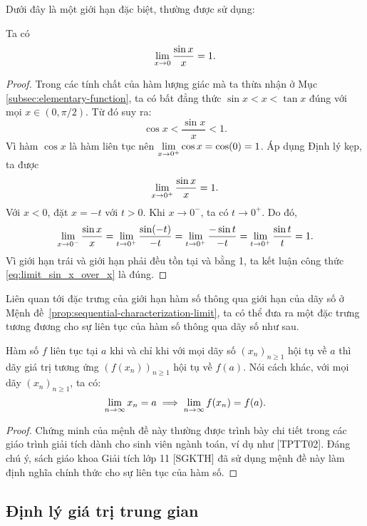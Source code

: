 Dưới đây là một giới hạn đặc biệt, thường được sử dụng:
\begin{proposition}
	\label{prop:limit_sin_x_over_x}
	Ta có
	\begin{equation} \label{eq:limit_sin_x_over_x}
		\lim\limits_{x \to 0} \dfrac{\sin x}{x} = 1.
	\end{equation}
\end{proposition}
\begin{proof}
    Trong các tính chất của hàm lượng giác mà ta thừa nhận ở Mục \ref{subsec:elementary-function}, ta có bất đẳng thức \( \sin x < x < \tan x \) đúng với mọi \( x \in (0, \pi/2) \). Từ đó suy ra:
	\[
		\cos x < \dfrac{\sin x}{x} < 1.
	\]
	Vì hàm \( \cos x \) là hàm liên tục nên \( \lim\limits_{x \to 0^+} \cos x = \cos(0) = 1 \). Áp dụng Định lý kẹp, ta được
	\[
		\lim\limits_{x \to 0^+} \dfrac{\sin x}{x} = 1.
	\]
	Với \( x < 0 \), đặt \( x = -t \) với \( t > 0 \). Khi \( x \to 0^- \), ta có \( t \to 0^+ \). Do đó,
	\[
		\lim\limits_{x \to 0^-} \dfrac{\sin x}{x} = \lim\limits_{t \to 0^+} \dfrac{\sin(-t)}{-t} = \lim\limits_{t \to 0^+} \dfrac{-\sin t}{-t} = \lim\limits_{t \to 0^+} \dfrac{\sin t}{t} = 1.
	\]
	Vì giới hạn trái và giới hạn phải đều tồn tại và bằng 1, ta kết luận công thức \eqref{eq:limit_sin_x_over_x} là đúng.
\end{proof}

Liên quan tới đặc trưng của giới hạn hàm số thông qua giới hạn của dãy số ở Mệnh đề~\ref{prop:sequential-characterization-limit}, ta có thể đưa ra một đặc trưng tương đương cho sự liên tục của hàm số thông qua dãy số như sau.

\begin{proposition}
	\label{prop:sequential_characterization_of_continuity}
	Hàm số \( f \) liên tục tại \( a \) khi và chỉ khi với mọi dãy số \( (x_n)_{n \ge 1} \) hội tụ về \( a \) thì dãy giá trị tương ứng \( (f(x_n))_{n \ge 1} \) hội tụ về \( f(a) \). Nói cách khác, với mọi dãy \( (x_n)_{n \ge 1} \), ta có:
	\[
		\lim\limits_{n \to \infty} x_n = a \implies \lim\limits_{n \to \infty} f(x_n) = f(a).
	\]
\end{proposition}

\begin{proof}
    Chứng minh của mệnh đề này thường được trình bày chi tiết trong các giáo trình giải tích dành cho sinh viên ngành toán, ví dụ như [TPTT02]. Đáng chú ý, sách giáo khoa Giải tích lớp 11 [SGKTH] đã sử dụng mệnh đề này làm định nghĩa chính thức cho sự liên tục của hàm số.
\end{proof}

\subsection{Định lý giá trị trung gian}
\label{subsec:intermediate_value_theorem}


